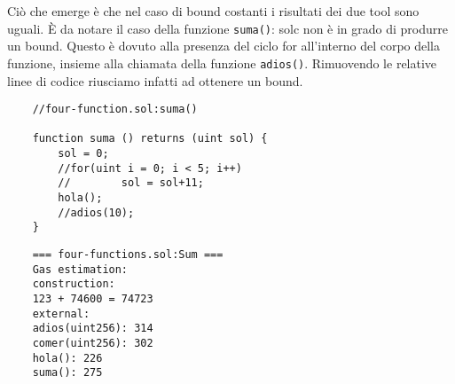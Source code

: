     Ciò che emerge è che nel caso di bound costanti i risultati dei due tool sono uguali. \`E da notare il caso della funzione \verb|suma()|: solc non è in grado di produrre un bound. Questo è dovuto alla presenza del ciclo for all'interno del corpo della funzione, insieme alla chiamata della funzione \verb|adios()|. Rimuovendo le relative linee di codice riusciamo infatti ad ottenere un bound.\newline
    

        \noindent
    \begin{minipage}[t]{.5\linewidth}
    \begin{lstlisting}
    //four-function.sol:suma()
        
    function suma () returns (uint sol) {
        sol = 0;
        //for(uint i = 0; i < 5; i++)
        //        sol = sol+11;
        hola();
        //adios(10);
    }
    \end{lstlisting}
    \end{minipage}
    \begin{minipage}[t]{.5\linewidth}
    \begin{lstlisting}
    === four-functions.sol:Sum ===
    Gas estimation:
    construction:
    123 + 74600 = 74723
    external:
    adios(uint256):	314
    comer(uint256):	302
    hola():	226
    suma():	275
    \end{lstlisting}
    \end{minipage}

